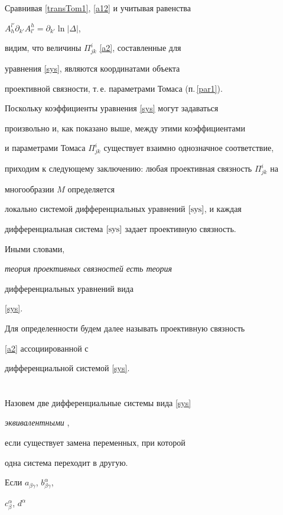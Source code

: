 Сравнивая \eqref{transTom1}, \eqref{a12} и учитывая равенства


$A^{l'}_{h}\partial_{k'}A^{h}_{l'}=\partial_{k'}\ln |\Delta|$,


видим, что величины $\Pi^i_{jk}$ \eqref{a2}, составленные для


уравнения \eqref{sys}, являются координатами объекта


проективной связности, т.\,е. параметрами Томаса (п.\,\ref{par1}).


Поскольку коэффициенты уравнения \eqref{sys} могут задаваться


произвольно и, как показано выше, между этими коэффициентами


и параметрами Томаса $\Pi^i_{jk}$ существует взаимно однозначное соответствие,


приходим к следующему заключению: любая проективная связность $\Pi^i_{jk}$ на 


многообразии $M$ определяется


локально системой дифференциальных уравнений $\eqref{sys}$, и каждая


дифференциальная система $\eqref{sys}$ задает проективную связность.


Иными словами, {\it теория проективных связностей есть теория


дифференциальных уравнений вида} \eqref{sys}.


Для определенности будем далее называть проективную связность


\eqref{a2} ассоциированной с


дифференциальной системой \eqref{sys}.








\section{}\label{par4}





Назовем две дифференциальные системы вида \eqref{sys}


{\it эквивалентными} \cite{Am_Am_04},


если существует замена переменных, при которой


одна система переходит в другую.


Если $a_{\beta\gamma}$, $b^{\alpha}_{\beta\gamma}$,


$c^{\alpha}_{\beta}$, $d^{\alpha}$


